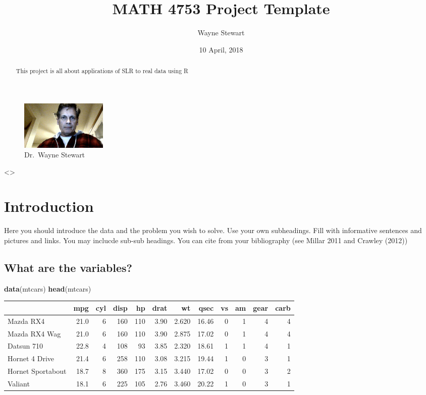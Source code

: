 \documentclass[]{article}
\title{MATH 4753 Project Template}
\author{Wayne Stewart}
\date{10 April, 2018}
\newenvironment{Shaded}{\begin{snugshade}}{\end{snugshade}}
\newcommand{\KeywordTok}[1]{\textcolor[rgb]{0.13,0.29,0.53}{\textbf{#1}}}
\newcommand{\NormalTok}[1]{#1}
\begin{document}
\maketitle
\begin{abstract}
This project is all about applications of SLR to real data using R
\end{abstract}

{
\setcounter{tocdepth}{4}
\tableofcontents
}
\begin{figure}
\centering
\includegraphics[width=0.20000\textwidth]{wayne.jpg}
\caption{Dr.~Wayne Stewart}
\end{figure}

\textless{}\center\textgreater{}

\section{Introduction}\label{introduction}

Here you should introduce the data and the problem you wish to solve.
Use your own subheadings. Fill with informative sentences and pictures
and links. You may inclucde sub-sub headings. You can cite from your
bibliography (see Millar 2011 and Crawley (2012))

\subsection{What are the variables?}\label{what-are-the-variables}

\begin{Shaded}
\begin{Highlighting}[]
\KeywordTok{data}\NormalTok{(mtcars)}
\KeywordTok{head}\NormalTok{(mtcars)}
\end{Highlighting}
\end{Shaded}

\begin{longtable}[]{@{}lrrrrrrrrrrr@{}}
\toprule
& mpg & cyl & disp & hp & drat & wt & qsec & vs & am & gear &
carb\tabularnewline
\midrule
\endhead
Mazda RX4 & 21.0 & 6 & 160 & 110 & 3.90 & 2.620 & 16.46 & 0 & 1 & 4 &
4\tabularnewline
Mazda RX4 Wag & 21.0 & 6 & 160 & 110 & 3.90 & 2.875 & 17.02 & 0 & 1 & 4
& 4\tabularnewline
Datsun 710 & 22.8 & 4 & 108 & 93 & 3.85 & 2.320 & 18.61 & 1 & 1 & 4 &
1\tabularnewline
Hornet 4 Drive & 21.4 & 6 & 258 & 110 & 3.08 & 3.215 & 19.44 & 1 & 0 & 3
& 1\tabularnewline
Hornet Sportabout & 18.7 & 8 & 360 & 175 & 3.15 & 3.440 & 17.02 & 0 & 0
& 3 & 2\tabularnewline
Valiant & 18.1 & 6 & 225 & 105 & 2.76 & 3.460 & 20.22 & 1 & 0 & 3 &
1\tabularnewline
\bottomrule
\end{longtable}
\end{document}
